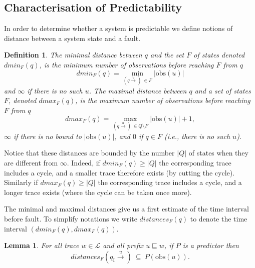 \documentclass{article}
\newtheorem{defi}{Definition}
\newtheorem{lemm}{Lemma}
\newcommand{\prefix}{\sqsubseteq}
\newcommand{\qi}[0]{q_{\mathrm{I}}}
\newcommand{\trans}[1]{\stackrel{#1}{\rightarrow}}
\newcommand{\lang}[0]{\mathcal{L}}
\newcommand{\obs}[0]{\mathrm{obs}}
\newcommand{\dmin}[1]{\mathit{dmin}_{#1}}
\newcommand{\dmax}[1]{\mathit{dmax}_{#1}}
\newcommand{\distances}{\mathit{distances}_F}
\begin{document}
\subsection{Characterisation of Predictability}

In order to determine whether a system is predictable 
we define notions of distance between a system state and a fault.  

\begin{defi}
  The \emph{minimal distance} between $q$ and the set $F$ of states 
  denoted $\dmin{F}(q)$, is the minimum number of observations 
  before reaching $F$ from $q$ 
  \begin{displaymath}
    \dmin{F}(q) = \min_{(q \trans{u}) \ \in F} |\obs(u)| 
  \end{displaymath}
  and $\infty$ if there is no such $u$.  
  The \emph{maximal distance} between $q$ and a set of states $F$, 
  denoted $\dmax{F}(q)$, is the maximum number of observations 
  before reaching $F$ from $q$ 
  \begin{displaymath}
    \dmax{F}(q) = \max_{(q \trans{u}) \ \in Q \setminus F} |\obs(u)| + 1, 
  \end{displaymath}
  $\infty$ if there is no bound to $|\obs(u)|$, 
  and $0$ if $q \in F$ (i.e., there is no such $u$).  
\end{defi}

Notice that these distances are bounded by the number $|Q|$ of states 
when they are different from $\infty$.  
Indeed, if $\dmin{F}(q) \ge |Q|$ 
the corresponding trace includes a cycle, 
and a smaller trace therefore exists (by cutting the cycle).  
Similarly if $\dmax{F}(q) \ge |Q|$ 
the corresponding trace includes a cycle, 
and a longer trace exists (where the cycle can be taken once more).  


The minimal and maximal distances give us 
a first estimate of the time interval before fault.  
To simplify notations we write $\distances(q)$ 
to denote the time interval $(\dmin{F}(q),\dmax{F}(q))$.  

\begin{lemm}\label{lemm::singlestateprediction}
  For all trace $w \in \lang$ and all prefix $u \prefix w$, 
  if $P$ is a predictor then
  \begin{displaymath}
    \distances(\qi \trans{u})\ \subseteq\ P(\obs(u)).  
  \end{displaymath}
\end{lemm}
\end{document}
